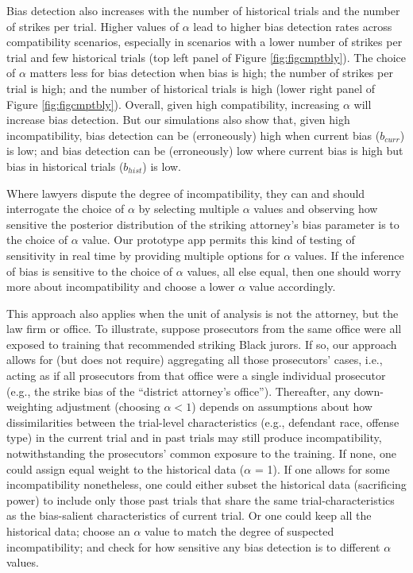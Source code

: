 \documentclass[12pt]{article}
\begin{document}
Bias detection also increases with the number of historical trials and the number of strikes per trial. Higher values of \(\alpha\) lead to higher bias detection rates across compatibility scenarios, especially in scenarios with a lower number of strikes per trial and few historical trials (top left panel of Figure \ref{fig:figcmptbly}). The choice of \(\alpha\) matters less for bias detection when bias is high; the number of strikes per trial is high; and the number of historical trials is high (lower right panel of Figure \ref{fig:figcmptbly}). Overall, given high compatibility, increasing \(\alpha\) will increase bias detection. But our simulations also show that, given high incompatibility, bias detection can be (erroneously) high when current bias (\(b_{curr}\)) is low; and bias detection can be (erroneously) low where current bias is high but bias in historical trials (\(b_{hist}\)) is low.

Where lawyers dispute the degree of incompatibility, they can and should interrogate the choice of \(\alpha\) by selecting multiple \(\alpha\) values and observing how sensitive the posterior distribution of the striking attorney's bias parameter is to the choice of \(\alpha\) value. Our prototype app permits this kind of testing of sensitivity in real time by providing multiple options for \(\alpha\) values. If the inference of bias is sensitive to the choice of \(\alpha\) values, all else equal, then one should worry more about incompatibility and choose a lower \(\alpha\) value accordingly.

This approach also applies when the unit of analysis is not the attorney, but the law firm or office. To illustrate, suppose prosecutors from the same office were all exposed to training that recommended striking Black jurors. If so, our approach allows for (but does not require) aggregating all those prosecutors' cases, i.e., acting as if all prosecutors from that office were a single individual prosecutor (e.g., the strike bias of the ``district attorney's office''). Thereafter, any down-weighting adjustment (choosing \(\alpha < 1\)) depends on assumptions about how dissimilarities between the trial-level characteristics (e.g., defendant race, offense type) in the current trial and in past trials may still produce incompatibility, notwithstanding the prosecutors' common exposure to the training. If none, one could assign equal weight to the historical data (\(\alpha\) = 1). If one allows for some incompatibility nonetheless, one could either subset the historical data (sacrificing power) to include only those past trials that share the same trial-characteristics as the bias-salient characteristics of current trial. Or one could keep all the historical data; choose an \(\alpha\) value to match the degree of suspected incompatibility; and check for how sensitive any bias detection is to different \(\alpha\) values.
\end{document}
